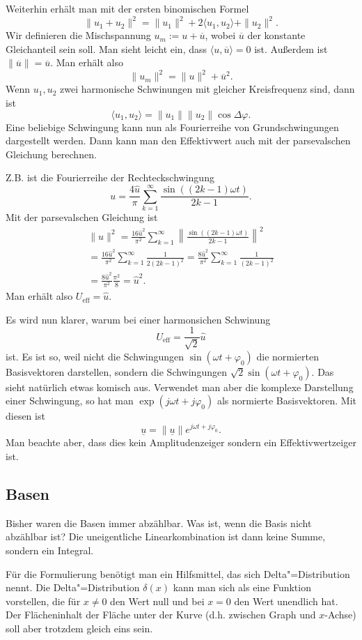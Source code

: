 \documentclass[a4paper,10pt,fleqn,twocolumn,twoside]{article}
\begin{document}
Weiterhin erhält man mit der ersten binomischen Formel
\[\|u_1+u_2\|^2 = \|u_1\|^2+2\langle u_1,u_2\rangle+\|u_2\|^2.\]
Wir definieren die Mischspannung \(u_m := u+\overline u\),
wobei \(\overline u\) der konstante Gleichanteil sein soll. Man sieht
leicht ein, dass \(\langle u,\overline u\rangle=0\) ist.
Außerdem ist \(\|\overline u\|=\overline u\). Man erhält also
\[\|u_m\|^2 = \|u\|^2+\overline u^2.\]
Wenn \(u_1,u_2\) zwei harmonische Schwinungen mit gleicher
Kreisfrequenz sind, dann ist
\[\langle u_1,u_2\rangle = \|u_1\|\|u_2\|\cos\Delta\varphi.\]
Eine beliebige Schwingung kann nun als Fourierreihe von
Grundschwingungen dargestellt werden. Dann kann man den Effektivwert
auch mit der parsevalschen Gleichung berechnen.

Z.B. ist die Fourierreihe der Rechteckschwingung
\[u = \frac{4\hat u}{\pi} \sum_{k=1}^{\infty}
\frac{\sin((2k-1)\omega t)}{2k-1}.\]
Mit der parsevalschen Gleichung ist
\begin{gather*}
\|u\|^2 = \frac{16\hat u^2}{\pi^2} \sum_{k=1}^{\infty}
\left\|\frac{\sin((2k-1)\omega t)}{2k-1}\right\|^2\\
= \frac{16\hat u^2}{\pi^2} \sum_{k=1}^{\infty} \frac{1}{2(2k-1)^2}
= \frac{8\hat u^2}{\pi^2} \sum_{k=1}^{\infty} \frac{1}{(2k-1)^2}\\
= \frac{8\hat u^2}{\pi^2} \frac{\pi^2}{8} = \hat u^2.
\end{gather*}
Man erhält also \(U_\mathrm{eff}=\hat u\).

Es wird nun klarer, warum bei einer harmonsichen Schwinung
\[U_\mathrm{eff}=\frac{1}{\sqrt{2}}\hat u\]
ist. Es ist so, weil nicht die Schwingungen
\(\sin(\omega t+\varphi_0)\) die normierten Basisvektoren darstellen,
sondern die Schwingungen \(\sqrt{2}\sin(\omega t+\varphi_0)\). Das
sieht natürlich etwas komisch aus. Verwendet man aber die komplexe
Darstellung einer Schwingung, so hat man
\(\exp(j\omega t+j\varphi_0)\) als normierte Basisvektoren.
Mit diesen ist
\[\underline u = \|\underline u\|e^{j\omega t+j\varphi_0}.\]
Man beachte aber, dass dies kein Amplitudenzeiger sondern ein
Effektivwertzeiger ist.

\subsection{Basen}

Bisher waren die Basen immer abzählbar. Was ist, wenn die Basis nicht
abzählbar ist? Die uneigentliche Linearkombination ist dann keine
Summe, sondern ein Integral.

Für die Formulierung benötigt man ein Hilfsmittel, das sich
Delta"=Distribution nennt. Die Delta"=Distribution \(\delta(x)\) kann man
sich als eine Funktion vorstellen, die für \(x\ne 0\) den Wert null
und bei \(x=0\) den Wert unendlich hat. Der Flächeninhalt der Fläche
unter der Kurve (d.h. zwischen Graph und \(x\)-Achse) soll aber
trotzdem gleich eins sein.
\end{document}
